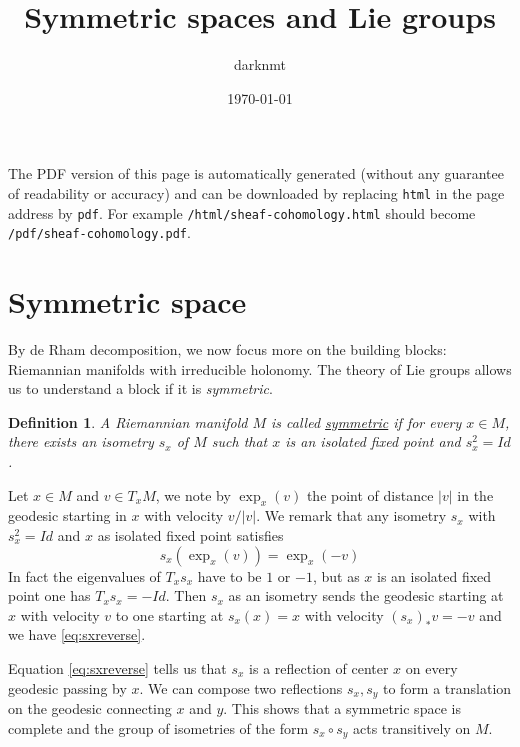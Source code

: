 \documentclass[11pt]{article}
\author{darknmt}
\date{\today}
\title{Symmetric spaces and Lie groups}
\newtheorem{definition}{Definition}
\begin{document}
\maketitle
\tableofcontents

\begin{info}
The PDF version of this page is automatically generated (without any guarantee of
readability or accuracy) and can be downloaded by replacing \texttt{html} in the page address by
\texttt{pdf}. 
For example \texttt{/html/sheaf-cohomology.html} should become \texttt{/pdf/sheaf-cohomology.pdf}.
\end{info}

\section{Symmetric space}
\label{sec:orgf40c825}
By de Rham decomposition, we now focus more on the building blocks: Riemannian manifolds with irreducible
holonomy. The theory of Lie groups allows us to understand a block if it is \emph{symmetric}.


\begin{definition}
A Riemannian manifold \(M\) is called \uline{symmetric} if for every \(x\in M\), there exists an isometry
\(s_x\) of \(M\) such that \(x\) is an isolated fixed point and \(s_x^2=Id\).
\end{definition}


Let \(x\in M\) and \(v\in T_xM\), we note by \(\exp_x(v)\) the point of distance \(|v|\) in the geodesic
starting in \(x\) with velocity \(v/|v|\). We remark that any isometry \(s_x\) with \(s_x^2=Id\) and \(x\) as isolated fixed
point satisfies 
\begin{equation}
  \label{eq:sxreverse}
s_x(\exp_x(v)) = \exp_x(-v)
\end{equation}
In fact the eigenvalues of \(T_xs_x\) have to be \(1\) or \(-1\), but as \(x\) is an isolated fixed point
one has \(T_xs_x = -Id\). Then \(s_x\) as an isometry sends the geodesic starting at \(x\) with velocity
\(v\) to one starting at \(s_x(x)=x\) with velocity \((s_x)_* v = -v\) and we have \eqref{eq:sxreverse}.


Equation \eqref{eq:sxreverse} tells us that \(s_x\) is a reflection of center \(x\) on every geodesic
passing by \(x\). We can compose two reflections \(s_x,s_y\) to form a translation on the geodesic
connecting \(x\) and \(y\). This shows that a symmetric space is complete and the group of isometries
of the form \(s_x\circ s_y\) acts transitively on \(M\).
\end{document}
